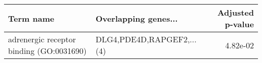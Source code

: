 \begin{tabular}{llr}
\toprule
                               Term name &      Overlapping genes... &  Adjusted p-value \\
\midrule
adrenergic receptor binding (GO:0031690) & DLG4,PDE4D,RAPGEF2,...(4) &          4.82e-02 \\
\bottomrule
\end{tabular}
